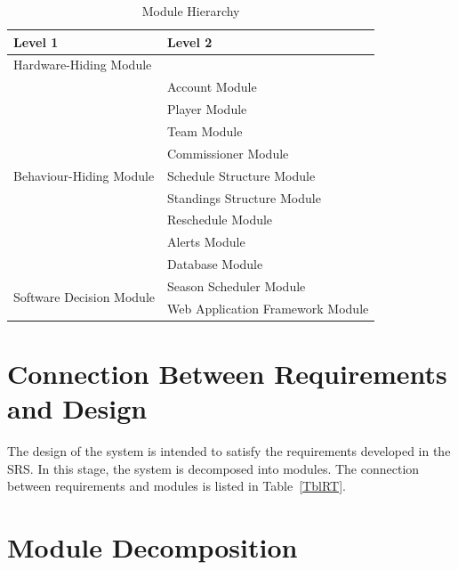 \documentclass[12pt, titlepage]{article}
\begin{document}
\begin{table}[h!]
\centering
\begin{tabular}{p{} p{}}
\toprule
\textbf{Level 1} & \textbf{Level 2}\\
\midrule

{Hardware-Hiding Module} & ~ \\
\midrule

\multirow{9}{0.3\textwidth}{Behaviour-Hiding Module} & Account Module\\
& Player Module\\
& Team Module\\
& Commissioner Module\\
& Schedule Structure Module\\
& Standings Structure Module\\
& Reschedule Module\\
& Alerts Module\\
& Database Module\\
\midrule

\multirow{2}{0.3\textwidth}{Software Decision Module} & Season Scheduler
Module\\
& Web Application Framework Module\\
\bottomrule

\end{tabular}
\caption{Module Hierarchy}
\label{TblMH}
\end{table}

\section{Connection Between Requirements and Design} \label{SecConnection}

The design of the system is intended to satisfy the requirements developed in
the SRS. In this stage, the system is decomposed into modules. The connection
between requirements and modules is listed in Table~\ref{TblRT}.


\section{Module Decomposition} \label{SecMD}
\end{document}
